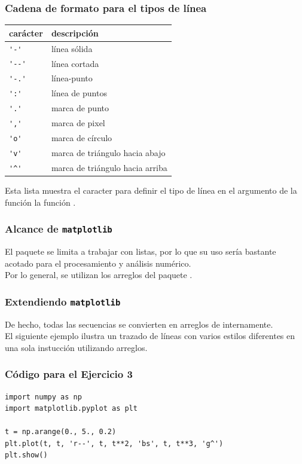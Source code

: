 \begin{frame}[fragile]
\frametitle{Cadena de formato para el tipos de línea}
\begin{minipage}{0.4\linewidth}
\fontsize{10}{10}\selectfont
\begin{tabular}{l | l}
carácter & descripción \\ \hline
\verb|'-'|	& línea sólida \\ \hline
\verb|'--'| & línea cortada \\ \hline
\verb|'-.'| & línea-punto \\ \hline
\verb|':'|	& línea de puntos \\ \hline
\verb|'.'|	& marca de punto \\ \hline
\verb|','|	& marca de pixel \\ \hline
\verb|'o'|	& marca de círculo \\ \hline
\verb|'v'|	& marca de triángulo hacia abajo \\ \hline
\verb|'^'|	& marca de triángulo hacia arriba
\end{tabular}
\end{minipage}
\hspace{0.7cm}
\begin{minipage}{0.5\linewidth}
\fontsize{13}{12}\selectfont
Esta lista muestra el caracter para definir el tipo de línea en el argumento de la función la función .
\end{minipage}
\end{frame}
\begin{frame}
\frametitle{Alcance de \texttt{matplotlib}}
El paquete  se limita a trabajar con listas, por lo que su uso sería bastante acotado para el procesamiento y análisis numérico.
\\
\medskip
Por lo general, se utilizan los arreglos del paquete .
\end{frame}
\begin{frame}
\frametitle{Extendiendo \texttt{matplotlib}}
De hecho, todas las secuencias se convierten en arreglos de  internamente.
\\
\medskip
El siguiente ejemplo ilustra un trazado de líneas con varios estilos diferentes en una sola instucción utilizando arreglos.
\end{frame}
\begin{frame}[fragile]
\frametitle{Código para el Ejercicio 3}
\begin{lstlisting}[style=codigopython]
import numpy as np
import matplotlib.pyplot as plt

t = np.arange(0., 5., 0.2)
plt.plot(t, t, 'r--', t, t**2, 'bs', t, t**3, 'g^')
plt.show()
\end{lstlisting}
\end{frame}
